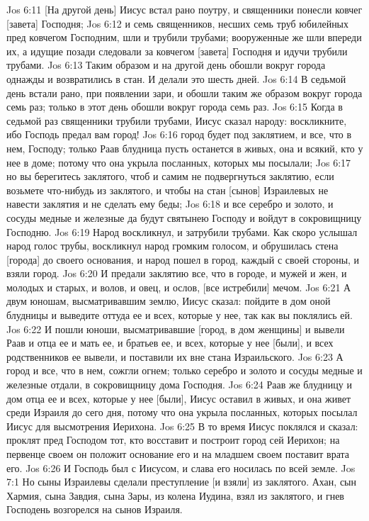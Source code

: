 Jos 6:11  [На другой день] Иисус встал рано поутру, и священники понесли ковчег [завета] Господня;
Jos 6:12  и семь священников, несших семь труб юбилейных пред ковчегом Господним, шли и трубили трубами; вооруженные же шли впереди их, а идущие позади следовали за ковчегом [завета] Господня и идучи трубили трубами.
Jos 6:13  Таким образом и на другой день обошли вокруг города однажды и возвратились в стан. И делали это шесть дней.
Jos 6:14  В седьмой день встали рано, при появлении зари, и обошли таким же образом вокруг города семь раз; только в этот день обошли вокруг города семь раз.
Jos 6:15  Когда в седьмой раз священники трубили трубами, Иисус сказал народу: воскликните, ибо Господь предал вам город!
Jos 6:16  город будет под заклятием, и все, что в нем, Господу; только Раав блудница пусть останется в живых, она и всякий, кто у нее в доме; потому что она укрыла посланных, которых мы посылали;
Jos 6:17  но вы берегитесь заклятого, чтоб и самим не подвергнуться заклятию, если возьмете что-нибудь из заклятого, и чтобы на стан [сынов] Израилевых не навести заклятия и не сделать ему беды;
Jos 6:18  и все серебро и золото, и сосуды медные и железные да будут святынею Господу и войдут в сокровищницу Господню.
Jos 6:19  Народ воскликнул, и затрубили трубами. Как скоро услышал народ голос трубы, воскликнул народ громким голосом, и обрушилась стена [города] до своего основания, и народ пошел в город, каждый с своей стороны, и взяли город.
Jos 6:20  И предали заклятию все, что в городе, и мужей и жен, и молодых и старых, и волов, и овец, и ослов, [все истребили] мечом.
Jos 6:21  А двум юношам, высматривавшим землю, Иисус сказал: пойдите в дом оной блудницы и выведите оттуда ее и всех, которые у нее, так как вы поклялись ей.
Jos 6:22  И пошли юноши, высматривавшие [город, в дом женщины] и вывели Раав и отца ее и мать ее, и братьев ее, и всех, которые у нее [были], и всех родственников ее вывели, и поставили их вне стана Израильского.
Jos 6:23  А город и все, что в нем, сожгли огнем; только серебро и золото и сосуды медные и железные отдали, в сокровищницу дома Господня.
Jos 6:24  Раав же блудницу и дом отца ее и всех, которые у нее [были], Иисус оставил в живых, и она живет среди Израиля до сего дня, потому что она укрыла посланных, которых посылал Иисус для высмотрения Иерихона.
Jos 6:25  В то время Иисус поклялся и сказал: проклят пред Господом тот, кто восставит и построит город сей Иерихон; на первенце своем он положит основание его и на младшем своем поставит врата его.
Jos 6:26  И Господь был с Иисусом, и слава его носилась по всей земле.
Jos 7:1  Но сыны Израилевы сделали преступление [и взяли] из заклятого. Ахан, сын Хармия, сына Завдия, сына Зары, из колена Иудина, взял из заклятого, и гнев Господень возгорелся на сынов Израиля.
